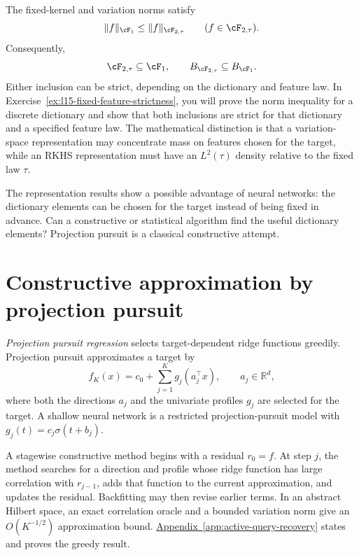 \documentclass[11pt,twoside]{article}
\newcommand{\appendixref}[1]{\hyperref[#1]{Appendix~\ref*{#1}}}
\newcommand{\R}{\mathbb R}
\theoremstyle{definition}
\theoremstyle{remark}
\begin{document}
The fixed-kernel and variation norms satisfy
\begin{equation}
 \|f\|_{\cF_1}
 \leq\|f\|_{\cF_{2,\tau}}
 \qquad(f\in\cF_{2,\tau}).
 \label{eq:F2-F1-norm-inclusion}
\end{equation}
Consequently,
\begin{equation}
 \cF_{2,\tau}\subseteq\cF_1,
 \qquad B_{\cF_{2,\tau}}\subseteq B_{\cF_1}.
 \label{eq:F2-F1-ball-inclusion}
\end{equation}
Either inclusion can be strict, depending on the dictionary and feature law.
In Exercise~\ref{ex:l15-fixed-feature-strictness}, you will prove the norm
inequality for a discrete dictionary and show that both inclusions are strict
for that dictionary and a specified feature law.
The mathematical distinction is that a variation-space representation may
concentrate mass on features chosen for the target, while an RKHS
representation must have an \(L^2(\tau)\) density relative to the fixed law
\(\tau\).

The representation results show a possible advantage of neural networks: the
dictionary elements can be chosen for the target instead of being fixed in
advance. Can a constructive or statistical algorithm find the useful
dictionary elements? Projection pursuit is a classical constructive attempt.

\section{Constructive approximation by projection pursuit}
\label{sec:structure}

\emph{Projection pursuit regression} selects target-dependent ridge functions
greedily. Projection pursuit approximates a target by
\begin{equation}
 f_K(x)=c_0+\sum_{j=1}^K g_j(a_j^\top x),
 \qquad a_j\in\R^d,
 \label{eq:projection-pursuit-model}
\end{equation}
where both the directions \(a_j\) and the univariate profiles \(g_j\) are
selected for the target. A shallow neural network is a restricted
projection-pursuit model with
\(g_j(t)=c_j\sigma(t+b_j)\).

A stagewise constructive method begins with a residual \(r_0=f\). At step
\(j\), the method searches for a direction and profile whose ridge function
has large correlation with \(r_{j-1}\), adds that function to the current
approximation, and updates the residual. Backfitting may then revise earlier
terms. In an abstract Hilbert space, an exact correlation oracle and a bounded
variation norm give an \(O(K^{-1/2})\) approximation bound.
\appendixref{app:active-query-recovery} states and proves the greedy result.
\end{document}
